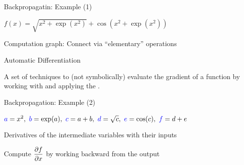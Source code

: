 \documentclass[fleqn,aspectratio=169]{beamer}
\begin{document}
\begin{frame}{Backpropagatin: Example (1)}

\plitemsep 0.1in

\bci 

\item $f(x) = \sqrt{x^2 + \exp(x^2)} + \cos\left (x^2 + \exp(x^2)\right)$



\item Computation graph: Connect via ``elementary'' operations

\smallskip
{}

\item Automatic Differentiation
\bci
\item  A set of techniques to  (not symbolically) evaluate the gradient of a function by working with  and applying the . 
\eci
\eci
\end{frame}

\begin{frame}{Backpropagation: Example (2)}

\plitemsep 0.1in

\bci 

\item 
$
\bluef{a} = x^2, \ \bluef{b}=\exp(a), \ \bluef{c}=a+b, \ \bluef{d}=\sqrt{c}, \ \bluef{e}=\cos(c), \ \bluef{f} = d+e
$
\item Derivatives of the intermediate variables with their inputs
\item Compute $\displaystyle \frac{\partial f}{\partial x}$ by working backward from the output
{
\small
\vspace{-0.3cm}
}
{
\small
\vspace{-0.3cm}
}

\eci
\end{frame}
\end{document}
